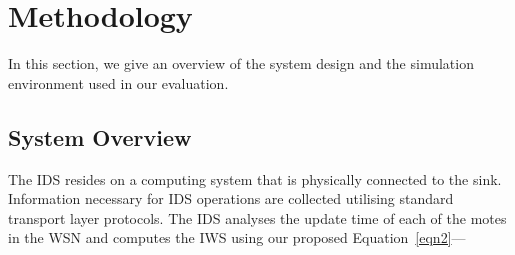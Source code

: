 \documentclass[conference,final]{IEEEtran}
\begin{document}
\section{Methodology}
\label{sec:meth}
In this section, we give an overview of the system design and the simulation environment used in our evaluation. %




\subsection*{System Overview}
\label{subsec:sysdeg}
The IDS resides on a computing system that is physically connected to the sink.
Information necessary for IDS operations are collected utilising standard transport layer protocols. 
The IDS analyses the update time of  each of the motes in the WSN and computes the IWS using our proposed Equation~\ref{eqn2}---
\end{document}
